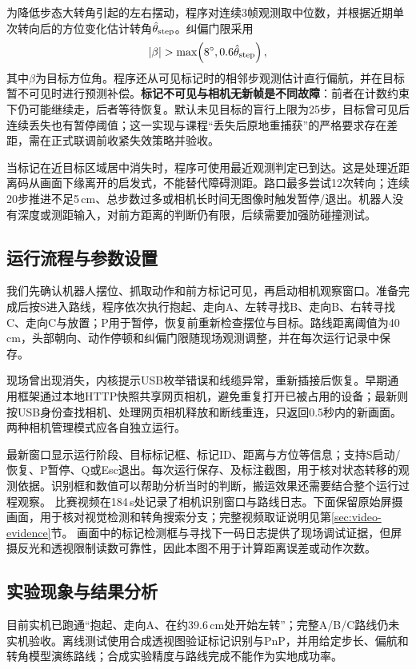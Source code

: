 为降低步态大转角引起的左右摆动，程序对连续3帧观测取中位数，并根据近期单次转向后的方位变化估计转角$\hat\theta_{\rm step}$。纠偏门限采用
\begin{equation}
|\beta|>\max\!\left(8^\circ,0.6\hat\theta_{\rm step}\right),
\end{equation}
其中$\beta$为目标方位角。程序还从可见标记时的相邻步观测估计直行偏航，并在目标暂不可见时进行预测补偿。\textbf{标记不可见与相机无新帧是不同故障}：前者在计数约束下仍可能继续走，后者等待恢复。默认未见目标的盲行上限为25步，目标曾可见后连续丢失也有暂停阈值；这一实现与课程“丢失后原地重捕获”的严格要求存在差距，需在正式联调前收紧失效策略并验收。

当标记在近目标区域居中消失时，程序可使用最近观测判定已到达。这是处理近距离码从画面下缘离开的启发式，不能替代障碍测距。路口最多尝试12次转向；连续20步推进不足5\,cm、总步数过多或相机长时间无图像时触发暂停/退出。机器人没有深度或测距输入，对前方距离的判断仍有限，后续需要加强防碰撞测试。

\subsection{运行流程与参数设置}
我们先确认机器人摆位、抓取动作和前方标记可见，再启动相机观察窗口。准备完成后按S进入路线，程序依次执行抱起、走向A、左转寻找B、走向B、右转寻找C、走向C与放置；P用于暂停，恢复前重新检查摆位与目标。路线距离阈值为40\,cm，头部朝向、动作停顿和纠偏门限随现场观测调整，并在每次运行记录中保存。

现场曾出现消失，内核提示USB枚举错误和线缆异常，重新插接后恢复。早期通用框架通过本地HTTP快照共享网页相机，避免重复打开已被占用的设备；最新则按USB身份查找相机、处理网页相机释放和断线重连，只返回0.5秒内的新画面。两种相机管理模式应各自独立运行。

最新窗口显示运行阶段、目标标记框、标记ID、距离与方位等信息；支持S启动/恢复、P暂停、Q或Esc退出。每次运行保存、及标注截图，用于核对状态转移的观测依据。识别框和数值可以帮助分析当时的判断，搬运效果还需要结合整个运行过程观察。
比赛视频在184\,s处记录了相机识别窗口与路线日志。下面保留原始屏摄画面，用于核对视觉检测和转角搜索分支；完整视频取证说明见第\ref{sec:video-evidence}节。
画面中的标记检测框与寻找下一码日志提供了现场调试证据，但屏摄反光和透视限制读数可靠性，因此本图不用于计算距离误差或动作次数。

\subsection{实验现象与结果分析}
目前实机已跑通“抱起、走向A、在约39.6\,cm处开始左转”；完整A/B/C路线仍未实机验收\cite{maze}。离线测试使用合成透视图验证标记识别与PnP，并用给定步长、偏航和转角模型演练路线；合成实验精度与路线完成不能作为实地成功率。

